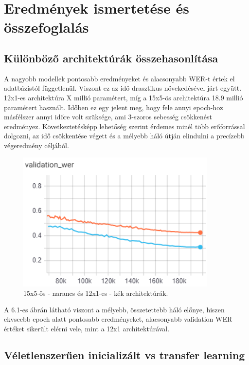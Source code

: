 \chapter{Eredmények ismertetése és összefoglalás}

\section{Különböző architektúrák összehasonlítása}

A nagyobb modellek pontosabb eredményeket és alacsonyabb WER-t értek el adatbázistól függetlenül. Viszont ez az idő drasztikus növekedésével járt együtt. 12x1-es architektúra X millió paramétert, míg a 15x5-ös architektúra 18.9 millió paramétert használt. Időben ez egy jelent meg, hogy fele annyi epoch-hoz másfélszer annyi időre volt szüksége, ami 3-szoros sebesség csökkenést eredményez. Következtetésképp lehetőség szerint érdemes minél több erőforrással dolgozni, az idő csökkentése végett és a mélyebb háló útján elindulni a precízebb végeredmény céljából.



\begin{figure}[!ht]
\centering
\includegraphics[width=100mm, keepaspectratio]{figures/architecture_12x1_vs_15x5.png}
\caption{15x5-ös - narancs és 12x1-es - kék architektúrák.}
\end{figure}

A 6.1-es ábrán látható viszont a mélyebb, összetettebb háló előnye, hiszen ekvseebb epoch alatt pontosabb eredményeket, alacsonyabb validation WER értéket sikerült elérni vele, mint a 12x1 architektúrával.

\section{Véletlenszerűen inicializált vs transfer learning}

